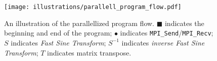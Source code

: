 \begin{figure}[htbp]
  \centering
  \texttt{[image: illustrations/parallell\_program\_flow.pdf]}
  \caption{An illustration of the parallellized program flow. $\blacksquare$ indicates the beginning and end of the program; $\bullet$ indicates \texttt{MPI\_Send}/\texttt{MPI\_Recv}; $S$ indicates \emph{Fast Sine Transform}; $S^{-1}$ indicates \emph{inverse Fast Sine Transform}; $T$ indicates matrix transpose.}
  \label{fig:program_flow}
\end{figure}


